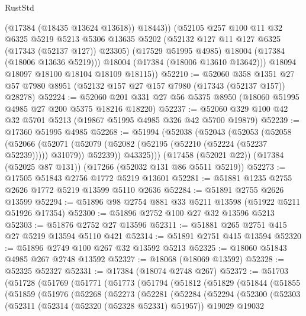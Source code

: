 \begin{lexlean}{RustStd}
\begin{coremodule}
              (@17384 (@18435 @13624 @13618))
              @18443))
          (@52105
            @257
            @100
            @11
            @32
            @6325
            @5219
            @5213
            @5306
            @13635
            @5202
            (@52132 @127 @11 @127 @6325 (@17343 (@52137 @127)) @23305)
            (@17529 @51995 @4985)
            @18004
            (@17384 (@18006 @13636 @5219)))
          @18004
          (@17384 (@18006 @13610 @13642)))
        @18094
        @18097
        @18100
        @18104
        @18109
        @18115))
@52210 := @52060
    @358
    @1351
    @27
    @57
    @7980
    @8951
    (@52132 @157 @27 @157 @7980 (@17343 (@52137 @157)) @28278)
@52224 := @52060 @201 @331 @27 @56 @5375 @8950 (@18060 @51995 @4985 @27 @200 @5375 @18216 @18220)
@52237 := @52060 @329 @100 @42 @32 @5701 @5213 (@19867 @51995 @4985 @326 @42 @5700 @19879)
@52239 := @17360 @51995 @4985
@52268 := @51994
    (@52038
      (@52043
        (@52053
          (@52058
            (@52066
              (@52071 (@52079 (@52082 (@52195 (@52210 (@52224 (@52237 @52239))))) @31079))
              @52239))
          @43325)))
    (@17458 (@52021 @22))
    (@17384 (@52025 @87 @131))
    (@17266 (@52032 @131 @86 @5511 @5219))
@52273 := @17505 @51843 @2756 @1772 @5219 @13601
@52281 := @51881 @1235 @2755 @2626 @1772 @5219 @13599 @5110 @2636
@52284 := @51891 @2755 @2626 @13599
@52294 := @51896 @98 @2754 @881 @33 @5211 @13598 (@51922 @5211 @51926 @17354)
@52300 := @51896 @2752 @100 @27 @32 @13596 @5213
@52303 := @51876 @2752 @27 @13596
@52311 := @51881 @265 @2751 @415 @27 @5219 @13594 @5110 @421
@52314 := @51891 @2751 @415 @13594
@52320 := @51896 @2749 @100 @267 @32 @13592 @5213
@52325 := @18060 @51843 @4985 @267 @2748 @13592
@52327 := @18068 (@18069 @13592)
@52328 := @52325 @52327
@52331 := @17384 (@18074 @2748 @267)
@52372 := @51703
    (@51728
      (@51769
        (@51771
          (@51773
            (@51794
              (@51812
                (@51829
                  (@51844
                    (@51855
                      (@51859
                        (@51976
                          (@52268
                            (@52273
                              (@52281
                                (@52284
                                  (@52294
                                    (@52300
                                      (@52303
                                        (@52311
                                          (@52314 (@52320 (@52328 @52331) @51957))
                                          @19029
                                          @19032

\end{coremodule}
\end{lexlean}
